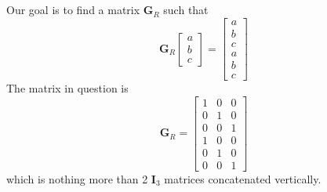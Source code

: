 \documentclass[]{article}
\begin{document}
\subsection{}

Our goal is to find a matrix \(\mathbf{G}_R\) such that
\begin{equation}
	\mathbf{G}_R
	\begin{bmatrix}
	a \\
	b \\
	c
	\end{bmatrix}
	=
	\begin{bmatrix}
	a \\
	b \\
	c \\
	a \\
	b \\
	c
	\end{bmatrix}
\end{equation}
The matrix in question is 
\begin{equation}
	\mathbf{G}_R = 
	\begin{bmatrix}
	1 & 0 & 0 \\
	0 & 1 & 0 \\
	0 & 0 & 1 \\
	1 & 0 & 0 \\
	0 & 1 & 0 \\
	0 & 0 & 1
	\end{bmatrix}
\end{equation}
which is nothing more than 2 \(\mathbf{I}_3\) matrices concatenated vertically. 

\subsection{}
\end{document}
